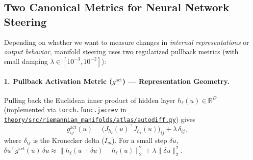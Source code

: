 \documentclass[11pt,a4paper]{article}
\newcommand{\R}{\mathbb{R}}
\theoremstyle{definition}
\begin{document}
\subsection{Two Canonical Metrics for Neural Network Steering}

Depending on whether we want to measure changes in \emph{internal representations} or \emph{output behavior}, manifold steering uses two regularized pullback metrics (with small damping $\lambda \in [10^{-3}, 10^{-2}]$):

\paragraph{1. Pullback Activation Metric ($g^{\mathrm{act}}$) --- Representation Geometry.}
Pulling back the Euclidean inner product of hidden layer $h_\ell(u) \in \R^D$ (implemented via \texttt{torch.func.jacrev} in \href{run:src/riemannian_manifolds/atlas/autodiff.py}{\texttt{theory/src/riemannian\_manifolds/atlas/autodiff.py}}) gives
\begin{equation}
    g^{\mathrm{act}}_{ij}(u) = \bigl(J_{h_\ell}(u)^\top J_{h_\ell}(u)\bigr)_{ij} + \lambda\,\delta_{ij},
    \label{eq:g-act}
\end{equation}
where $\delta_{ij}$ is the Kronecker delta ($I_m$). For a small step $\delta u$, $\delta u^\top g^{\mathrm{act}}(u)\,\delta u \approx \|h_\ell(u + \delta u) - h_\ell(u)\|_2^2 + \lambda\|\delta u\|_2^2$.
\end{document}
